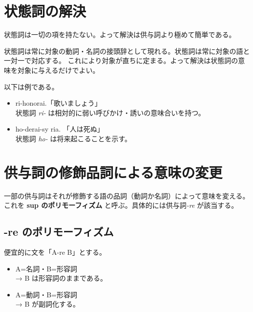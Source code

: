 \section{状態詞の解決}

状態詞は一切の項を持たない。よって解決は供与詞より極めて簡単である。

状態詞は常に対象の動詞・名詞の接頭辞として現れる。状態詞は常に対象の語と一対一で対応する。
これにより対象が直ちに定まる。よって解決は状態詞の意味を対象に与えるだけでよい。

以下は例である。

\begin{itemize}
    \item ri-honorai.「歌いましょう」\\ 状態詞 \emph{ri-} は相対的に弱い呼びかけ・誘いの意味合いを持つ。
    \item ho-derai-sy ria. 「人は死ぬ」\\ 状態詞 \emph{ho-} は将来起こることを示す。
\end{itemize}

\section{供与詞の修飾品詞による意味の変更}

一部の供与詞はそれが修飾する語の品詞（動詞か名詞）によって意味を変える。これを \textbf{sup のポリモーフィズム} と呼ぶ。具体的には供与詞\emph{-re} が該当する。

\subsection{-re のポリモーフィズム}

便宜的に文を「A-re B」とする。

\begin{itemize}
    \item A=名詞・B=形容詞 \\ → B は形容詞のままである。
    \item A=動詞・B=形容詞 \\ → B が副詞化する。
\end{itemize}